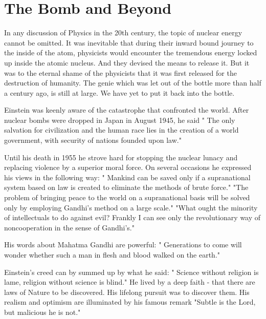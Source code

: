 \section*{The Bomb and Beyond}

In any discussion of Physics in the 20th century, the topic of
nuclear energy cannot be omitted. It was inevitable that during
their inward bound journey to the inside of the atom, physicists
would encounter the tremendous energy locked up inside the atomic
nucleus. And they devised the means to release it. But it was to
the eternal shame of the physicists that it was first released for
the destruction of humanity. The genie which was let out of the
bottle more than half a century ago, is still at large. We have
yet to put it back into the bottle.

Einstein was keenly aware of the catastrophe that confronted the
world. After nuclear bombs were dropped in Japan in August 1945,
he said " The only salvation for civilization and the human race
lies in the creation of a world government, with security of
nations founded upon law."

Until his death in 1955 he strove hard for stopping the
nuclear lunacy and replacing violence by a superior moral force.
On several occasions he expressed his views in the following way:
" Mankind can be saved only if a supranational system based
on law is created to eliminate the methods of brute force."
"The problem of bringing peace to the world on a supranational basis
will be solved only by employing Gandhi's method on a large scale."
"What ought the minority of intellectuals to do against evil?
Frankly I can see only the revolutionary way of noncooperation
in the sense of Gandhi's."

His words about Mahatma Gandhi are powerful: " Generations to come
will wonder whether such a man in flesh and blood walked on the
earth."

Einstein's creed can by summed up by what he said: " Science
without religion is lame, religion without science is blind."
He lived by a deep faith - that there are laws of Nature to be
discovered. His lifelong pursuit was to discover them. His
realism and optimism are illuminated by his famous remark
"Subtle is the Lord, but malicious he is not."





























